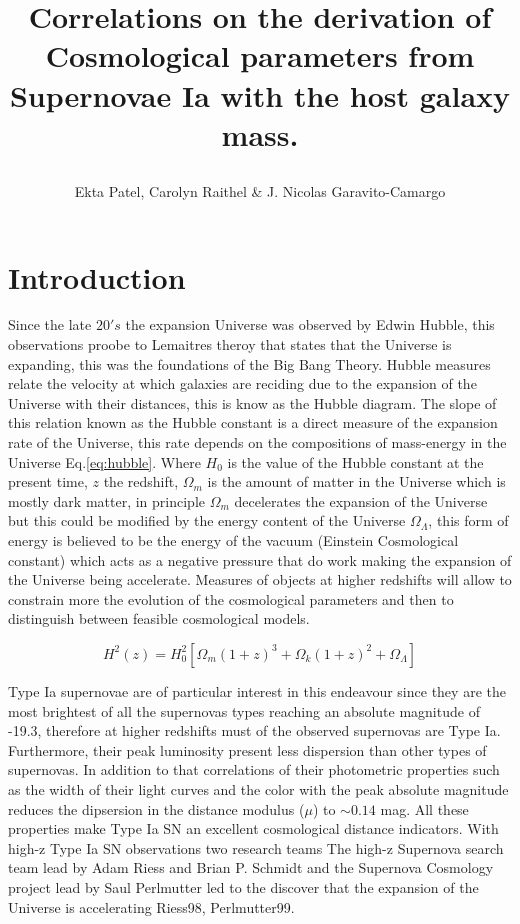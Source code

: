 \documentclass[11pt]{article}
\title{\begin{LARGE}
{Correlations on the derivation of Cosmological parameters from Supernovae Ia
with the host galaxy mass.}
\end{LARGE}}
\begin{document}
\maketitle

\author{ \begin{center}
Ekta Patel, Carolyn Raithel \& J. Nicolas Garavito-Camargo
\end{center}}

\section{Introduction}

Since the late $20's$ the expansion Universe was observed by Edwin
Hubble, this observations proobe to Lemaitres theroy that states that
the Universe is expanding, this was the foundations of the Big Bang
Theory. Hubble measures relate the velocity at which galaxies are
reciding due to the expansion of the Universe with their distances,
this is know as the Hubble diagram. The slope of this relation known
as the Hubble constant is a direct measure of the expansion rate of
the Universe, this rate depends on the compositions of mass-energy in
the Universe Eq.\ref{eq:hubble}. Where $H_0$ is the value of the
Hubble constant at the present time, $z$ the redshift, $\Omega_m$
 is the amount of matter in the Universe which is mostly dark matter,
 in principle $\Omega_m$ decelerates the expansion of the Universe
 but this could be modified
by the energy content of the Universe $\Omega_{\Lambda}$, this form of energy
is believed to be the energy of the vacuum (Einstein
Cosmological constant) which acts as a negative pressure that do work
making the expansion of the Universe being accelerate. Measures of
objects at higher redshifts will allow to constrain more the evolution
of the cosmological parameters and then to distinguish between feasible
cosmological models.

\begin{equation}\label{eq:hubble}
H^2(z) = H_0^2 [\Omega_m(1+z)^3 + \Omega_k (1+z)^2 + \Omega_{\Lambda}]
\end{equation}

Type Ia supernovae are of particular interest in this endeavour since
they are the most brightest of all the supernovas types reaching an absolute magnitude
of -19.3, therefore at higher redshifts must of the observed
supernovas are Type Ia. Furthermore, their peak luminosity
present less dispersion than other types of supernovas.
In addition to that correlations of their photometric properties such
as the width of their light curves and the color with the peak
absolute magnitude reduces the dipsersion in the distance modulus
($\mu$) to $\sim 0.14$ mag. All these properties make Type Ia SN
an excellent cosmological distance indicators. With high-z Type Ia SN 
observations two research teams The high-z Supernova search
team lead by Adam Riess and Brian P. Schmidt and the Supernova
Cosmology project lead by Saul Perlmutter led to the discover that the
expansion of the Universe is accelerating Riess98, Perlmutter99.
\end{document}
